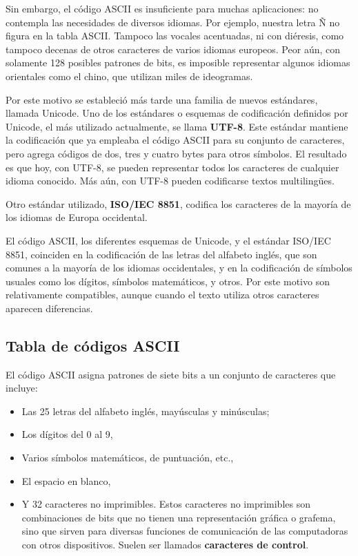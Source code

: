 \documentclass[spanish,a4paper,]{article}
\providecommand{\tightlist}{%
  \setlength{\itemsep}{0pt}\setlength{\parskip}{0pt}}
\begin{document}
Sin embargo, el código ASCII es insuficiente para muchas aplicaciones:
no contempla las necesidades de diversos idiomas. Por ejemplo, nuestra
letra Ñ no figura en la tabla ASCII. Tampoco las vocales acentuadas, ni
con diéresis, como tampoco decenas de otros caracteres de varios idiomas
europeos. Peor aún, con solamente 128 posibles patrones de bits, es
imposible representar algunos idiomas orientales como el chino, que
utilizan miles de ideogramas.

Por este motivo se estableció más tarde una familia de nuevos
estándares, llamada Unicode. Uno de los estándares o esquemas de
codificación definidos por Unicode, el más utilizado actualmente, se
llama \textbf{UTF-8}. Este estándar mantiene la codificación que ya
empleaba el código ASCII para su conjunto de caracteres, pero agrega
códigos de dos, tres y cuatro bytes para otros símbolos. El resultado es
que hoy, con UTF-8, se pueden representar todos los caracteres de
cualquier idioma conocido. Más aún, con UTF-8 pueden codificarse textos
multilingües.

Otro estándar utilizado, \textbf{ISO/IEC 8851}, codifica los caracteres
de la mayoría de los idiomas de Europa occidental.

El código ASCII, los diferentes esquemas de Unicode, y el estándar
ISO/IEC 8851, coinciden en la codificación de las letras del alfabeto
inglés, que son comunes a la mayoría de los idiomas occidentales, y en
la codificación de símbolos usuales como los dígitos, símbolos
matemáticos, y otros. Por este motivo son relativamente compatibles,
aunque cuando el texto utiliza otros caracteres aparecen diferencias.

\hypertarget{tabla-de-cuxf3digos-ascii}{%
\subsection{Tabla de códigos ASCII}\label{tabla-de-cuxf3digos-ascii}}

El código ASCII asigna patrones de siete bits a un conjunto de
caracteres que incluye:

\begin{itemize}
\tightlist
\item
  Las 25 letras del alfabeto inglés, mayúsculas y minúsculas;
\item
  Los dígitos del 0 al 9,
\item
  Varios símbolos matemáticos, de puntuación, etc.,
\item
  El espacio en blanco,
\item
  Y 32 caracteres no imprimibles. Estos caracteres no imprimibles son
  combinaciones de bits que no tienen una representación gráfica o
  grafema, sino que sirven para diversas funciones de comunicación de
  las computadoras con otros dispositivos. Suelen ser llamados
  \textbf{caracteres de control}.
\end{itemize}
\end{document}
